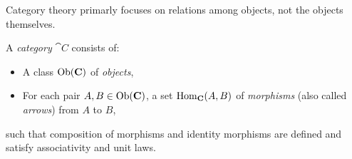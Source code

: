 \documentclass[12pt]{book}
\begin{document}
Category theory primarly focuses on relations among objects, not the objects themselves.

\begin{definition}
A \emph{category} \( \cat{C} \) consists of:
\begin{itemize}[nosep]
  \item A class \( \mathrm{Ob}(\mathbf{C}) \) of \emph{objects},
  \item For each pair \( A, B \in \mathrm{Ob}(\mathbf{C}) \), a set \( \mathrm{Hom}_{\mathbf{C}}(A, B) \) of \emph{morphisms} (also called \emph{arrows}) from \( A \) to \( B \),
\end{itemize}
such that composition of morphisms and identity morphisms are defined and satisfy associativity and unit laws.
\end{definition}
\end{document}

